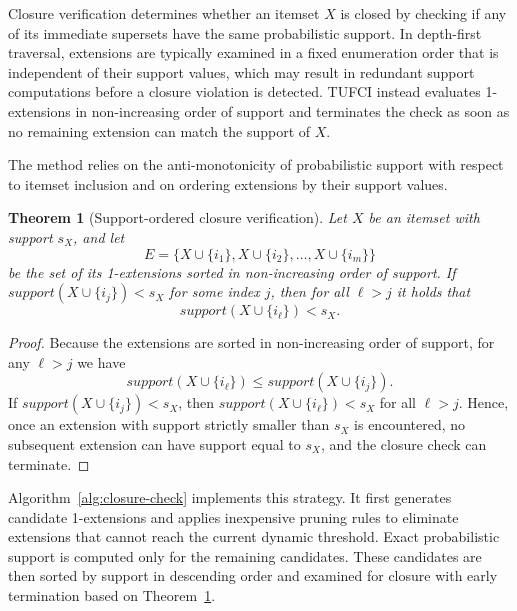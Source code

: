 \documentclass[10pt,letterpaper]{article}
\newtheorem{theorem}{Theorem}
\begin{document}
Closure verification determines whether an itemset $X$ is closed by checking if any of its immediate supersets have the same probabilistic support. In depth-first traversal, extensions are typically examined in a fixed enumeration order that is independent of their support values, which may result in redundant support computations before a closure violation is detected. TUFCI instead evaluates 1-extensions in non-increasing order of support and terminates the check as soon as no remaining extension can match the support of $X$.

The method relies on the anti-monotonicity of probabilistic support with respect to itemset inclusion and on ordering extensions by their support values.

\begin{theorem}[Support-ordered closure verification]
\label{thm:closure}
Let $X$ be an itemset with support $s_X$, and let 
\[
E = \{X \cup \{i_1\}, X \cup \{i_2\}, \ldots, X \cup \{i_m\}\}
\]
be the set of its 1-extensions sorted in non-increasing order of support. If $\mathit{support}(X \cup \{i_j\}) < s_X$ for some index $j$, then for all $\ell > j$ it holds that
\[
\mathit{support}(X \cup \{i_\ell\}) < s_X .
\]
\end{theorem}

\begin{proof}
Because the extensions are sorted in non-increasing order of support, for any $\ell > j$ we have
\[
\mathit{support}(X \cup \{i_\ell\}) \le \mathit{support}(X \cup \{i_j\}) .
\]
If $\mathit{support}(X \cup \{i_j\}) < s_X$, then $\mathit{support}(X \cup \{i_\ell\}) < s_X$ for all $\ell > j$. Hence, once an extension with support strictly smaller than $s_X$ is encountered, no subsequent extension can have support equal to $s_X$, and the closure check can terminate.
\end{proof}


Algorithm~\ref{alg:closure-check} implements this strategy. It first generates candidate 1-extensions and applies inexpensive pruning rules to eliminate extensions that cannot reach the current dynamic threshold. Exact probabilistic support is computed only for the remaining candidates. These candidates are then sorted by support in descending order and examined for closure with early termination based on Theorem~\ref{thm:closure}.
\end{document}
